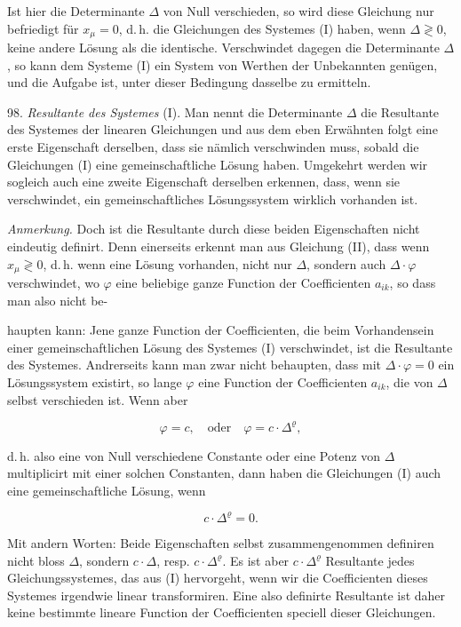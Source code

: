 
Ist hier die Determinante $\Delta$ von Null verschieden, so wird diese
Gleichung nur befriedigt für $x_\mu=0$, d.\,h. die Gleichungen des
Systemes (I) haben, wenn $\Delta \gtrless 0$, keine andere Lösung als
die identische. Verschwindet dagegen die Determinante $\Delta$, so kann
dem Systeme (I) ein System von Werthen der Unbekannten genügen, und
die Aufgabe ist, unter dieser Bedingung dasselbe zu ermitteln.

98. \textit{Resultante des Systemes} (I). Man nennt die Determinante
$\Delta$ die Resultante des Systemes der linearen Gleichungen und aus
dem eben Erwähnten folgt eine erste Eigenschaft derselben, dass sie
nämlich verschwinden muss, sobald die Gleichungen (I) eine
gemeinschaftliche Lösung haben. Umgekehrt werden wir sogleich auch
eine zweite Eigenschaft derselben erkennen, dass, wenn sie verschwindet,
ein gemeinschaftliches Lösungssystem wirklich vorhanden ist.

\textit{Anmerkung.} Doch ist die Resultante durch diese beiden
Eigenschaften nicht eindeutig definirt. Denn einerseits erkennt man aus
Gleichung (II), dass wenn $x_\mu \gtrless 0$, d.\,h. wenn eine Lösung
vorhanden, nicht nur $\Delta$, sondern auch $\Delta\cdot\varphi$
verschwindet, wo $\varphi$ eine beliebige ganze Function der
Coefficienten $a_{ik}$, so dass man also nicht be-


haupten kann: Jene ganze Function der Coefficienten, die beim
Vorhandensein einer gemeinschaftlichen Lösung des Systemes (I)
verschwindet, ist die Resultante des Systemes. Andrerseits kann man
zwar nicht behaupten, dass mit $\Delta\cdot\varphi=0$ ein
Lösungssystem existirt, so lange $\varphi$ eine Function der
Coefficienten $a_{ik}$, die von $\Delta$ selbst verschieden ist. Wenn
aber

\[
\varphi=c, \quad \text{oder} \quad \varphi=c\cdot\Delta^{\varrho},
\]

d.\,h. also eine von Null verschiedene Constante oder eine Potenz von
$\Delta$ multiplicirt mit einer solchen Constanten, dann haben die
Gleichungen (I) auch eine gemeinschaftliche Lösung, wenn

\[
c\cdot\Delta^{\varrho}=0.
\]

Mit andern Worten: Beide Eigenschaften selbst zusammengenommen
definiren nicht bloss $\Delta$, sondern $c\cdot\Delta$, resp.
$c\cdot\Delta^{\varrho}$. Es ist aber $c\cdot\Delta^{\varrho}$
Resultante jedes Gleichungssystemes, das aus (I) hervorgeht, wenn wir
die Coefficienten dieses Systemes irgendwie linear transformiren. Eine
also definirte Resultante ist daher keine bestimmte lineare Function
der Coefficienten speciell dieser Gleichungen.

